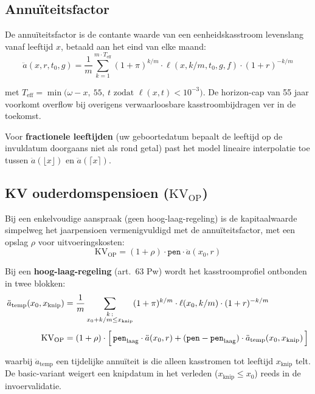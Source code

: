 \documentclass[11pt,a4paper]{article}
\newcommand{\ann}{\ddot{a}}                 %
\newcommand{\anntemp}{\ddot{a}_{\text{temp}}}
\newcommand{\code}[1]{\texttt{#1}}
\begin{document}
\subsection{Annuïteitsfactor}

De annuïteitsfactor is de contante waarde van een eenheidskasstroom levenslang vanaf leeftijd $x$, betaald aan het eind van elke maand:
\begin{equation}
\ann(x, r, t_0, g) = \frac{1}{m} \sum_{k=1}^{m \cdot T_{\text{eff}}} (1+\pi)^{k/m} \cdot \ell(x, k/m, t_0, g, f) \cdot (1+r)^{-k/m}
\end{equation}

met $T_{\text{eff}} = \min\bigl(\omega - x,\ 55,\ t \text{ zodat } \ell(x, t) < 10^{-3}\bigr)$. De horizon-cap van 55 jaar voorkomt overflow bij overigens verwaarloosbare kasstroombijdragen ver in de toekomst.

Voor \textbf{fractionele leeftijden} (uw geboortedatum bepaalt de leeftijd op de invuldatum doorgaans niet als rond getal) past het model lineaire interpolatie toe tussen $\ann(\lfloor x \rfloor)$ en $\ann(\lceil x \rceil)$.

\subsection{KV ouderdomspensioen ($\text{KV}_{\text{OP}}$)}

Bij een enkelvoudige aanspraak (geen hoog-laag-regeling) is de kapitaalwaarde simpelweg het jaarpensioen vermenigvuldigd met de annuïteitsfactor, met een opslag $\rho$ voor uitvoeringskosten:
\begin{equation}
\text{KV}_{\text{OP}} = (1 + \rho) \cdot \code{pen} \cdot \ann(x_0, r)
\end{equation}

Bij een \textbf{hoog-laag-regeling} (art.\ 63 Pw) wordt het kasstroomprofiel ontbonden in twee blokken:
\begin{align}
\anntemp(x_0, x_{\text{knip}}) &= \frac{1}{m} \sum_{\substack{k \,:\\ x_0 + k/m \le x_{\text{knip}}}} (1+\pi)^{k/m} \cdot \ell(x_0, k/m) \cdot (1+r)^{-k/m}\\[0.4em]
\text{KV}_{\text{OP}} &= (1 + \rho) \cdot \Bigl[\, \code{pen}_{\text{laag}} \cdot \ann(x_0, r) + (\code{pen} - \code{pen}_{\text{laag}}) \cdot \anntemp(x_0, x_{\text{knip}}) \,\Bigr]
\end{align}

waarbij $\anntemp$ een tijdelijke annuïteit is die alleen kasstromen tot leeftijd $x_{\text{knip}}$ telt. De basic-variant weigert een knipdatum in het verleden ($x_{\text{knip}} \le x_0$) reeds in de invoervalidatie.
\end{document}
